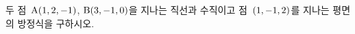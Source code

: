 두 점~$\mathrm{A}(1{,}\mkern3mu\mathopen{}2{,}\mkern3mu\mathopen{}-1)$, $\mathrm{B}(3{,}\mkern3mu\mathopen{}-1{,}\mkern3mu\mathopen{}0)$을 지나는 직선과 수직이고 점~$(1{,}\mkern3mu\mathopen{}-1{,}\mkern3mu\mathopen{}2)$를 지나는 평면의 방정식을 구하시오.
